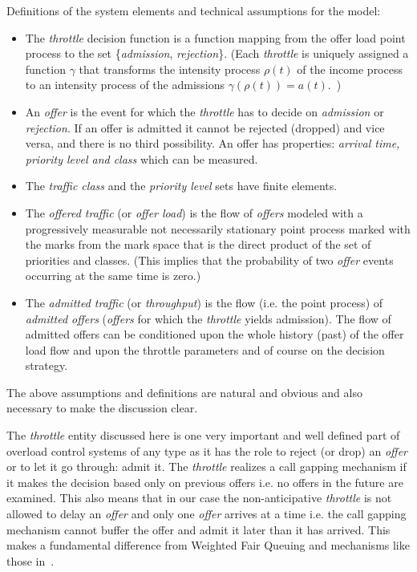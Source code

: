 \documentclass[conference]{IEEEtran}
\begin{document}
Definitions of the system elements and technical assumptions for the
model:
\begin{itemize}
 \item The \textit{throttle} decision function is a function mapping from the offer load point process
 to the set \{\textit{admission}, \textit{rejection}\}. (Each
 \textit{throttle} is uniquely assigned a function $\gamma$ that transforms the intensity process $\rho(t)$ of the income process to
an intensity process of the admissions
$\gamma(\rho(t))=a(t)$.~\cite{OGATA})
 \item An \textit{offer} is the event for which the \textit{throttle} has to decide on \textit{admission} or \textit{rejection}. If an offer is
admitted it cannot be rejected (dropped) and vice versa, and there
is no third possibility. An offer has properties: \textit{arrival
time, priority level and class} which can be measured.
 \item The \textit{traffic class} and the \textit{priority level} sets have finite elements.
 \item The \textit{offered traffic} (or \textit{offer load}) is the flow of \textit{offers} modeled with a
progressively measurable not necessarily stationary point process
marked with the marks from the mark space that is the direct product
of the set of priorities and classes. (This implies that the
probability of two \textit{offer} events occurring at the same time
is zero.)
 \item The \textit{admitted traffic} (or \textit{throughput}) is the flow (i.e. the point process) of \textit{admitted offers}
(\textit{offers} for which the \textit{throttle} yields admission).
The flow of admitted offers can be conditioned upon the whole
history (past) of the offer load flow and upon the throttle
parameters and of course on the decision strategy.
\end{itemize}

The above assumptions and definitions are natural and obvious and
also necessary to make the discussion clear.

The \textit{throttle} entity discussed here is one very important
and well defined part of overload control systems of any type as it
has the role to reject (or drop) an \textit{offer} or to let it go
through: admit it. The \textit{throttle} realizes a call gapping
mechanism if it makes the decision based only on previous offers
i.e. no offers in the future are examined. This also means that in
our case the non-anticipative \textit{throttle} is not allowed to
delay an \textit{offer} and only one \textit{offer} arrives at a
time i.e. the call gapping mechanism cannot buffer the offer and
admit it later than it has arrived. This makes a fundamental
difference from Weighted Fair Queuing and mechanisms like those
in~\cite{WFQ,GPS}.
\end{document}
